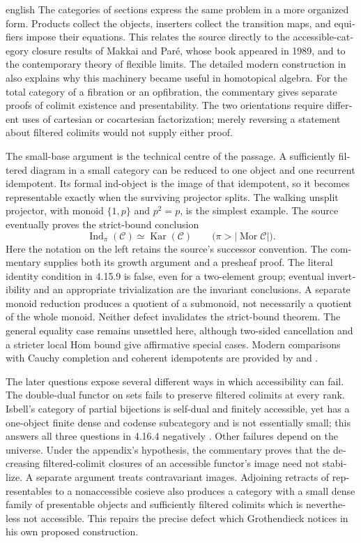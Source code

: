 \begin{otherlanguage}{english}
\begin{otherlanguage*}{english}
The categories of sections express the same problem in a more organized form. Products collect the objects, inserters collect the transition maps, and equifiers impose their equations. This relates the source directly to the accessible-category closure results of Makkai and Par\'e, whose book appeared in 1989, and to the contemporary theory of flexible limits. The detailed modern construction in \citet[Appendix~A]{ChingRiehl2014} also explains why this machinery became useful in homotopical algebra. For the total category of a fibration or an opfibration, the commentary gives separate proofs of colimit existence and presentability. The two orientations require different uses of cartesian or cocartesian factorization; merely reversing a statement about filtered colimits would not supply either proof.

The small-base argument is the technical centre of the passage. A sufficiently filtered diagram in a small category can be reduced to one object and one recurrent idempotent. Its formal ind-object is the image of that idempotent, so it becomes representable exactly when the surviving projector splits. The walking unsplit projector, with monoid $\{1,p\}$ and $p^2=p$, is the simplest example. The source eventually proves the strict-bound conclusion
\[
 \operatorname{Ind}_{\pi}(\mathcal C)\simeq
 \operatorname{Kar}(\mathcal C)
 \qquad\bigl(\pi>|\operatorname{Mor}\mathcal C|\bigr).
\]
Here the notation on the left retains the source's successor convention. The commentary supplies both its growth argument and a presheaf proof. The literal identity condition in 4.15.9 is false, even for a two-element group; eventual invertibility and an appropriate trivialization are the invariant conclusions. A separate monoid reduction produces a quotient of a submonoid, not necessarily a quotient of the whole monoid. Neither defect invalidates the strict-bound theorem. The general equality case remains unsettled here, although two-sided cancellation and a stricter local Hom bound give affirmative special cases. Modern comparisons with Cauchy completion and coherent idempotents are provided by \citet{Tendas2022Continuity} and \citet[Sections~5.4.2--5.4.3]{Lurie2009HTT}.

The later questions expose several different ways in which accessibility can fail. The double-dual functor on sets fails to preserve filtered colimits at every rank. Isbell's category of partial bijections is self-dual and finitely accessible, yet has a one-object finite dense and codense subcategory and is not essentially small; this answers all three questions in 4.16.4 negatively \citep[Example~8.7]{AveryLeinster2021}. Other failures depend on the universe. Under the appendix's hypothesis, the commentary proves that the decreasing filtered-colimit closures of an accessible functor's image need not stabilize. A separate argument treats contravariant images. Adjoining retracts of representables to a nonaccessible cosieve also produces a category with a small dense family of presentable objects and sufficiently filtered colimits which is nevertheless not accessible. This repairs the precise defect which Grothendieck notices in his own proposed construction.


\end{otherlanguage*}
\end{otherlanguage}
